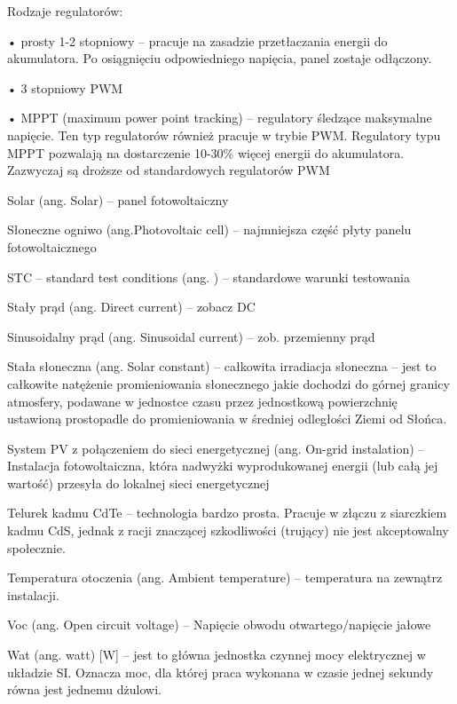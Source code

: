 \documentclass[12pt,a4paper]{article}
\begin{document}
Rodzaje regulatorów:

•    prosty 1-2 stopniowy – pracuje na zasadzie przetłaczania energii do akumulatora. Po osiągnięciu odpowiedniego napięcia, panel zostaje odłączony.

•    3 stopniowy PWM

•    MPPT (maximum power point tracking) – regulatory śledzące maksymalne napięcie. Ten typ regulatorów również pracuje w trybie PWM. Regulatory typu MPPT pozwalają na dostarczenie 10-30\% więcej energii do akumulatora. Zazwyczaj są droższe od standardowych regulatorów PWM

Solar (ang. Solar) – panel fotowoltaiczny

Słoneczne ogniwo (ang.Photovoltaic cell) – najmniejsza część płyty panelu fotowoltaicznego

STC – standard test conditions (ang. ) – standardowe warunki testowania

Stały prąd (ang. Direct current) – zobacz DC

Sinusoidalny prąd (ang. Sinusoidal current) – zob. przemienny prąd

Stała słoneczna (ang. Solar constant) – całkowita irradiacja słoneczna – jest to całkowite natężenie promieniowania słonecznego jakie dochodzi do górnej granicy atmosfery, podawane w jednostce czasu przez jednostkową powierzchnię ustawioną prostopadle do promieniowania w średniej odległości Ziemi od Słońca.

System PV z połączeniem do sieci energetycznej (ang. On-grid instalation)  – Instalacja fotowoltaiczna, która nadwyżki wyprodukowanej energii (lub całą jej wartość) przesyła do lokalnej sieci energetycznej


Telurek kadmu CdTe – technologia bardzo prosta. Pracuje w złączu z siarczkiem kadmu CdS, jednak z racji znaczącej szkodliwości (trujący) nie jest akceptowalny społecznie.

Temperatura otoczenia (ang. Ambient temperature) – temperatura na zewnątrz instalacji.

Voc (ang. Open circuit voltage) – Napięcie obwodu otwartego/napięcie jałowe

Wat (ang. watt) [W] – jest to główna jednostka czynnej mocy elektrycznej w układzie SI. Oznacza moc, dla której praca wykonana w czasie jednej sekundy równa jest jednemu dżulowi.
\end{document}
